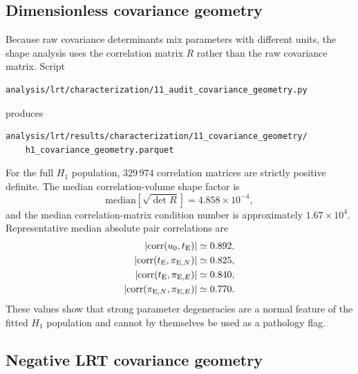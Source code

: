 \documentclass[11pt,a4paper]{article}
\newcommand{\pen}{\pi_{{\rm E},N}}
\newcommand{\pee}{\pi_{{\rm E},E}}
\newcommand{\te}{t_{\rm E}}
\newcommand{\Halt}{H_1}
\begin{document}
\subsection{Dimensionless covariance geometry}

Because raw covariance determinants mix parameters with different units, the
shape analysis uses the correlation matrix $R$ rather than the raw covariance
matrix.  Script
\begin{verbatim}
analysis/lrt/characterization/11_audit_covariance_geometry.py
\end{verbatim}
produces
\begin{verbatim}
analysis/lrt/results/characterization/11_covariance_geometry/
    h1_covariance_geometry.parquet
\end{verbatim}

For the full $\Halt$ population, $329\,974$ correlation matrices are strictly
positive definite.  The median correlation-volume shape factor is
\begin{equation}
    \mathrm{median}\!\left[\sqrt{\det R}\right]
    =4.858\times10^{-4},
\end{equation}
and the median correlation-matrix condition number is approximately
$1.67\times10^4$.  Representative median absolute pair correlations are
\begin{align}
    |\mathrm{corr}(u_0,\te)| &\simeq 0.892,\\
    |\mathrm{corr}(\te,\pen)| &\simeq 0.825,\\
    |\mathrm{corr}(\te,\pee)| &\simeq 0.840,\\
    |\mathrm{corr}(\pen,\pee)| &\simeq 0.770.
\end{align}
These values show that strong parameter degeneracies are a normal feature of
the fitted $\Halt$ population and cannot by themselves be used as a pathology
flag.

\subsection{Negative LRT covariance geometry}
\end{document}
